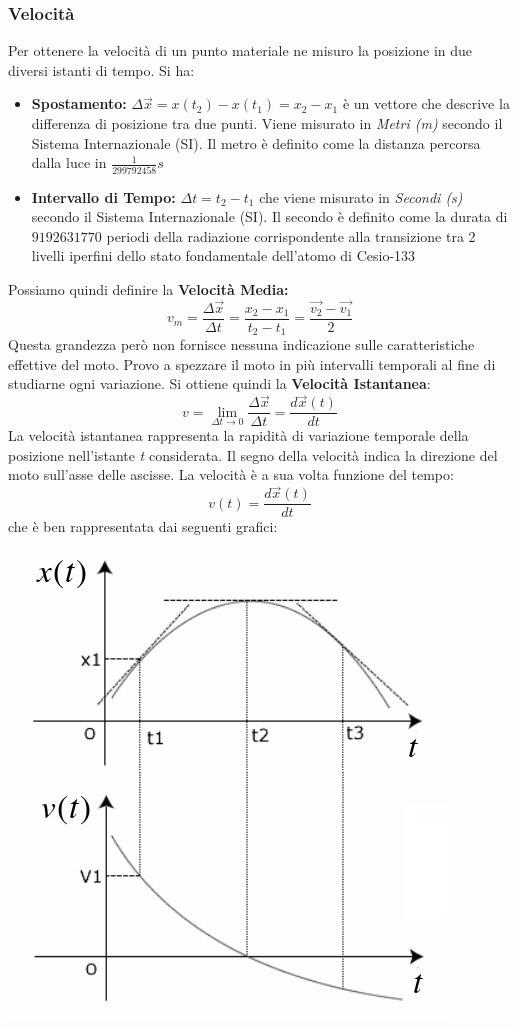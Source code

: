 \documentclass[a4paper,12pt, oneside]{book}
\begin{document}
\subsubsection{Velocità}
Per ottenere la velocità di un punto materiale ne misuro la posizione in due diversi istanti di tempo. Si ha:
\begin{itemize}
\item \textbf{Spostamento:} $\Delta \vec{x}= x(t_2)-x(t_1)=x_2-x_1$ è un vettore che descrive la differenza di posizione tra due punti. Viene misurato in \textit{Metri (m)} secondo il Sistema Internazionale (SI). Il metro è definito come la distanza percorsa dalla luce in $\frac{1}{299792458}s$ 
\item \textbf{Intervallo di Tempo:} $\Delta t=t_2-t_1$ che viene misurato in \textit{Secondi (s)} secondo il Sistema Internazionale (SI). Il secondo è definito come la durata di $9192631770$ periodi della radiazione corrispondente alla transizione tra 2 livelli iperfini dello stato fondamentale dell'atomo di Cesio-133
\end{itemize}
Possiamo quindi definire la \textbf{Velocità Media:}
$$v_m=\frac{\Delta \vec{x}}{\Delta t}=\frac{x_2-x_1}{t_2-t_1}=\frac{\vec{v_2}-\vec{v_1}}{2}$$
Questa grandezza però non fornisce nessuna indicazione sulle caratteristiche effettive del moto. Provo a spezzare il moto in più intervalli temporali al fine di studiarne ogni variazione. Si ottiene quindi la \textbf{Velocità Istantanea}:
$$v=\lim_{\Delta t \to 0}\frac{\Delta \vec{x}}{\Delta t}=\frac{d \vec{x}(t)}{d t}$$
La velocità istantanea rappresenta la rapidità di variazione temporale della posizione nell'istante \textit{t} considerata. Il segno della velocità indica la direzione del moto sull'asse delle ascisse. La velocità è a sua volta funzione del tempo:
$$v(t)=\frac{d\vec{x}(t)}{dt}$$
che è ben rappresentata dai seguenti grafici:
\begin{center}
\includegraphics[scale=0.36]{img/ist.png}
\end{center}
\end{document}
